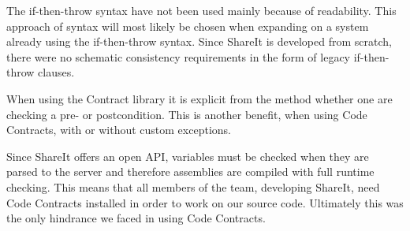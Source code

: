 \documentclass[../report.tex]{subfiles}
\begin{document}
The if-then-throw syntax have not been used mainly because of readability. This approach of syntax will most likely be chosen when expanding on a system already using the if-then-throw syntax. Since ShareIt is developed from scratch, there were no schematic consistency requirements in the form of legacy if-then-throw clauses.

When using the Contract library it is explicit from the method whether one are checking a pre- or postcondition. This is another benefit, when using Code Contracts, with or without custom exceptions.

Since ShareIt offers an open API, variables must be checked when they are parsed to the server and therefore assemblies are compiled with full runtime checking. This means that all members of the team, developing ShareIt, need Code Contracts installed in order to work on our source code. Ultimately this was the only hindrance we faced in using Code Contracts.






\end{document}

